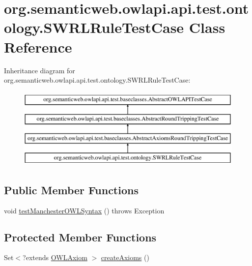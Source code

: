 \hypertarget{classorg_1_1semanticweb_1_1owlapi_1_1api_1_1test_1_1ontology_1_1_s_w_r_l_rule_test_case}{\section{org.\-semanticweb.\-owlapi.\-api.\-test.\-ontology.\-S\-W\-R\-L\-Rule\-Test\-Case Class Reference}
\label{classorg_1_1semanticweb_1_1owlapi_1_1api_1_1test_1_1ontology_1_1_s_w_r_l_rule_test_case}
}
Inheritance diagram for org.\-semanticweb.\-owlapi.\-api.\-test.\-ontology.\-S\-W\-R\-L\-Rule\-Test\-Case\-:\begin{figure}[H]
\begin{center}
\leavevmode
\includegraphics[height=4.000000cm]{classorg_1_1semanticweb_1_1owlapi_1_1api_1_1test_1_1ontology_1_1_s_w_r_l_rule_test_case}
\end{center}
\end{figure}
\subsection*{Public Member Functions}
\begin{DoxyCompactItemize}
\item 
void \hyperlink{classorg_1_1semanticweb_1_1owlapi_1_1api_1_1test_1_1ontology_1_1_s_w_r_l_rule_test_case_ac4a215c53324b04659bc7afedab8bc9f}{test\-Manchester\-O\-W\-L\-Syntax} ()  throws Exception 
\end{DoxyCompactItemize}
\subsection*{Protected Member Functions}
\begin{DoxyCompactItemize}
\item 
Set$<$?extends \hyperlink{interfaceorg_1_1semanticweb_1_1owlapi_1_1model_1_1_o_w_l_axiom}{O\-W\-L\-Axiom} $>$ \hyperlink{classorg_1_1semanticweb_1_1owlapi_1_1api_1_1test_1_1ontology_1_1_s_w_r_l_rule_test_case_a012c274c17dd1bacf67f1375df0b98d7}{create\-Axioms} ()
\end{DoxyCompactItemize}



